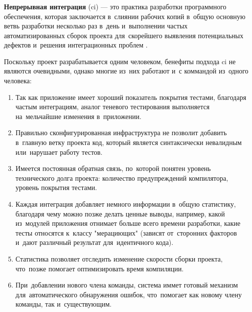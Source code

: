 \subsubsection{}
\label{sec:testing:ci:ci}

\textbf{Непрерывная интеграция} (\gls{ci}) — это практика разработки программного обеспечения, которая заключается в~слиянии рабочих копий в~общую основную ветвь разработки несколько раз в~день и~выполнении частых автоматизированных сборок проекта для~скорейшего выявления потенциальных дефектов и~решения интеграционных проблем \cite{wiki:ci}. 

Поскольку проект разрабатывается одним человеком, бенефиты подхода \gls{ci} не являются очевидными, однако многие из~них работают и~с коммандой из~одного человека:

\begin{enumerate}
	\item Так как приложение имеет хороший показатель покрытия тестами, благодаря частым интеграциям, аналог теневого тестирования выполняется на~мельчайшие изменения в~приложении.
	\item Правильно сконфигурированная инфраструктура не позволит добавить в~главную ветку проекта код, который является синтаксически невалидным или~нарушает работу тестов.
	\item Имеется постоянная обратная связь, по~которой понятен уровень технического долга проекта: количество предупреждений компилятора, уровень покрытия тестами.
	\item Каждая интеграция добавляет немного информации в~общую статистику, благодаря чему можно позже делать ценные выводы, например, какой из~модулей приложения отнимает больше всего времени разработки, какие тесты относятся к~классу "мерациющих" (зависят от~сторонних факторов и~дают различный результат для~идентичного кода).
	\item Статистика позволяет отследить изменение скорости сборки проекта, что~позже помогает оптимизировать время компиляции.
	\item При~добавлении нового члена команды, система иммет готовый механизм для~автоматического обнаружения ошибок, что~помогает как новому члену команды, так и~существующим.
\end{enumerate}